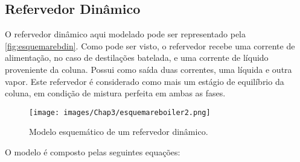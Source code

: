 \subsection{Refervedor Dinâmico} \label{sec:modelorefervedordinamico}
O refervedor dinâmico aqui modelado pode ser representado pela \autoref{fig:esquemarebdin}. Como pode ser visto, o
refervedor recebe uma corrente de alimentação, no caso de destilações batelada, e uma corrente de líquido
proveniente da coluna. Possui como
saída duas correntes, uma líquida e outra vapor. Este refervedor é considerado como mais um estágio de
equilíbrio da coluna, em condição de mistura perfeita em ambas as fases.

\begin{figure}[htb]
\centering \texttt{[image: images/Chap3/esquemareboiler2.png]}
\caption{Modelo esquemático de um refervedor dinâmico.}
\label{fig:esquemarebdin}
\end{figure}

O modelo é composto pelas seguintes equações:

